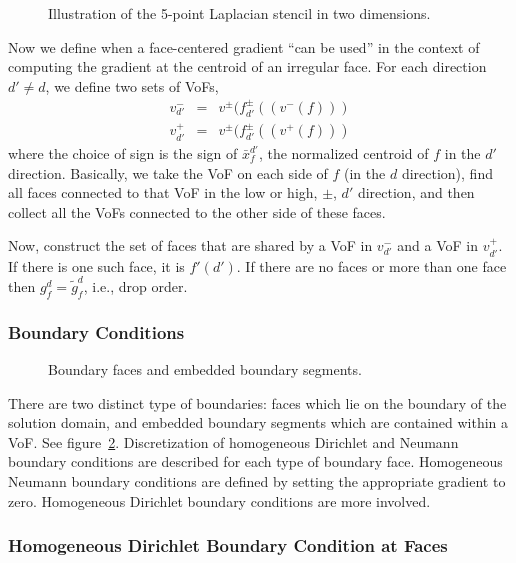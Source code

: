 \begin{figure}
\epsfxsize=3.0in
\hspace{1.0in} 
\caption{Illustration of the 5-point Laplacian stencil in two dimensions.}
\label{fig::simpleLap}
\end{figure}

Now we define when a face-centered gradient ``can be used'' in the context of
computing the gradient at the centroid of an irregular face.  
For each direction~$d'\neq d$, we define two sets of VoFs,
\begin{eqnarray}
v^-_{d'} &=& v^\pm ( f^\pm_{d'} ( ( v^- ( f ) ) )\nonumber \\
v^+_{d'} &=& v^\pm ( f^\pm_{d'} ( ( v^+ ( f ) ) )
\end{eqnarray}
where the choice of sign is the sign of $\bar{x}^{d'}_f$, the normalized
centroid of $f$ in the $d'$ direction.  Basically, we take the VoF on each 
side of $f$ (in the $d$ direction), find all faces connected to that VoF in
the low or high, $\pm$, $d'$ direction, and then collect all the VoFs connected to the other side of these faces.

Now, construct the set of faces that are shared by a VoF in $v^-_{d'}$ and
a VoF in $v^+_{d'}$.  If there is one such face, it is $f'(d')$.  If there
are no faces or more than one face then $g^d_f = \widetilde{g}^d_f$, i.e.,
drop order.


\subsubsection{Boundary Conditions}
\label{sec::bc}

\begin{figure}
\epsfxsize=3.0in
\hspace{1.0in} 
\caption{Boundary faces and embedded boundary segments.}
\label{fig::faces}
\end{figure}

There are two distinct type of boundaries: faces which lie on the
boundary of the solution domain, and embedded boundary segments
which are contained within a VoF.  See figure~\ref{fig::faces}.
Discretization of homogeneous Dirichlet and Neumann boundary conditions
are described for each type of boundary face.  Homogeneous Neumann boundary
conditions are defined by setting the appropriate gradient to zero.
Homogeneous Dirichlet boundary conditions are more involved.

\subsubsection{Homogeneous Dirichlet Boundary Condition at Faces}
\label{sec::facebc}

